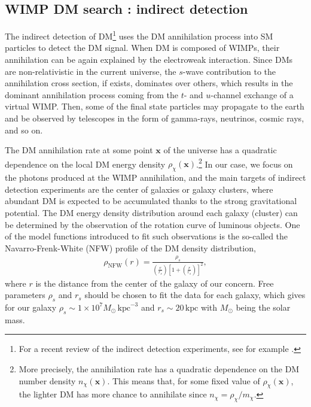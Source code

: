 \documentclass[12pt,twoside,book]{article}
\begin{document}
\subsection{WIMP DM search : indirect detection}
\label{sec:indirect_detection}

The indirect detection of DM\footnote{
  For a recent review of the indirect detection experiments, see for example \cite{Gaskins:2016cha}.
}
uses the DM annihilation process into SM particles to detect the DM signal.
When DM is composed of WIMPs, their annihilation can be again explained by the electroweak interaction.
Since DMs are non-relativistic in the current universe, the $s$-wave contribution to the annihilation cross section, if exists, dominates over others, which results in the dominant annihilation process coming from the $t$- and $u$-channel exchange of a virtual WIMP.
Then, some of the final state particles may propagate to the earth and be observed by telescopes in the form of gamma-rays, neutrinos, cosmic rays, and so on.

The DM annihilation rate at some point $\bm{x}$ of the universe has a quadratic dependence on the local DM energy density $\rho_\chi (\bm{x})$.\footnote{
  More precisely, the annihilation rate has a quadratic dependence on the DM number density $n_\chi (\bm{x})$.
  This means that, for some fixed value of $\rho_\chi (\bm{x})$, the lighter DM has more chance to annihilate since $n_\chi = \rho_\chi / m_\chi$.
}
In our case, we focus on the photons produced at the WIMP annihilation, and the main targets of indirect detection experiments are the center of galaxies or galaxy clusters, where abundant DM is expected to be accumulated thanks to the strong gravitational potential.
The DM energy density distribution around each galaxy (cluster) can be determined by the observation of the rotation curve of luminous objects.
One of the model functions introduced to fit such observations is the so-called the Navarro-Frenk-White (NFW) profile \cite{Navarro:1995iw, Navarro:1996gj} of the DM density distribution,
\begin{align}
  \rho_{\mathrm{NFW}} (r) = \frac{\rho_s}
  { \left( \frac{r}{r_s} \right) \left[ 1 + \left( \frac{r}{r_s} \right) \right]^2},
\end{align}
where $r$ is the distance from the center of the galaxy of our concern.
Free parameters $\rho_s$ and $r_s$ should be chosen to fit the data for each galaxy, which gives for our galaxy $\rho_s \sim 1\times 10^7 M_\odot\, \mathrm{kpc}^{-3}$ and $r_s \sim 20\,\mathrm{kpc}$ \cite{Fornasa:2013iaa} with $M_\odot$ being the solar mass.
\end{document}
